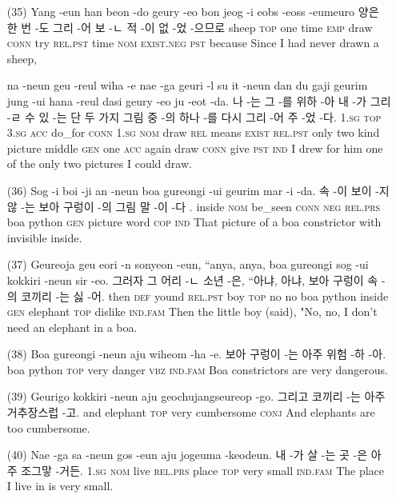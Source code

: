 \begin{itemize}
\item [(35)]
\tgl
		{Yang -eun han beon -do geury -eo bon jeog -i eobs -eoss -eumeuro}
		{양은 한 번 -도 그리 -어 보 -ㄴ 적 -이 없 -었 -으므로}
		{sheep	\textsc{top}	one	time	\textsc{emp}	draw	\textsc{conn}	try	\textsc{rel.pst}	time	\textsc{nom}	\textsc{exist.neg}	\textsc{pst}	because}
		{Since I had never drawn a sheep,}

\tgl
		{na -neun geu -reul wiha -e nae -ga geuri -l su it -neun dan du gaji geurim jung -ui hana -reul dasi geury -eo ju -eot -da.}
		{나 -는 그 -를 위하 -아 내 -가 그리 -ㄹ 수 있 -는 단 두 가지 그림 중 -의 하나 -를 다시 그리 -어 주 -었 -다.}
		{\textsc{1.sg}	\textsc{top}	\textsc{3.sg}	\textsc{acc}	do\_for	\textsc{conn}	\textsc{1.sg}	\textsc{nom}	draw	\textsc{rel}	means	\textsc{exist}	\textsc{rel.pst}	only	two	kind	picture	middle	\textsc{gen}	one	\textsc{acc}	again	draw	\textsc{conn}	give	\textsc{pst}	\textsc{ind}}
		{I drew for him one of the only two pictures I could draw.}
		
\item [(36)]
\tgl
		{Sog -i boi -ji an -neun boa gureongi -ui geurim mar -i -da.}
		{속 -이 보이 -지 않 -는 보아 구렁이 -의 그림 말 -이 -다 .}
		{inside	\textsc{nom}	be\_seen	\textsc{conn}	\textsc{neg}	\textsc{rel.prs}	boa	python	\textsc{gen}	picture	word	\textsc{cop}	\textsc{ind}}
		{That picture of a boa constrictor with invisible inside.}

\item [(37)]
\tgl
		{Geureoja geu eori -n sonyeon -eun, ``anya, anya, boa gureongi sog -ui kokkiri -neun sir -eo.}
		{그러자 그 어리 -ㄴ 소년 -은, ``아냐, 아냐, 보아 구렁이 속 -의 코끼리 -는 싫 -어.}
		{then	\textsc{def}	yound	\textsc{rel.pst}	boy	\textsc{top}	no	no	boa	python	inside	\textsc{gen}	elephant	\textsc{top}	dislike	\textsc{ind.fam}}
		{Then the little boy (said), "No, no, I don't need an elephant in a boa.}

\item [(38)]
\tgl
		{Boa gureongi -neun aju wiheom -ha -e.}
		{보아 구렁이 -는 아주 위험 -하 -아.}
		{boa	python	\textsc{top}	very	danger	\textsc{vbz}	\textsc{ind.fam}}
		{Boa constrictors are very dangerous.}

\item [(39)]
\tgl
		{Geurigo kokkiri -neun aju geochujangseureop -go.}
		{그리고 코끼리 -는 아주 거추장스럽 -고.}
		{and	elephant	\textsc{top}	very	cumbersome	\textsc{conj}}
		{And elephants are too cumbersome.}

\item [(40)]
\tgl
		{Nae -ga sa -neun gos -eun aju jogeuma -keodeun.}
		{내 -가 살 -는 곳 -은 아주 조그맣 -거든.}
		{\textsc{1.sg}	\textsc{nom}	live	\textsc{rel.prs}	place	\textsc{top}	very	small	\textsc{ind.fam}}
		{The place I live in is very small.}


\end{itemize}

